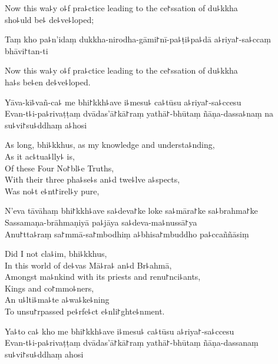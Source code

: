 \begin{english}
  Now this wa꜕y o꜕f pra꜕ctice leading to the ce꜓ssation of du꜕kkha\\
  sho꜕uld be꜕ de꜕ve꜕loped;
\end{english}

Taṃ kho pa꜕n'idaṃ dukkha-nirodha-gāmi꜓nī-pa꜕ṭi꜕pa꜕dā a꜕riya꜓-sa꜕ccaṃ bhāvi꜓tan-ti

\begin{english}
  Now this wa꜕y o꜕f pra꜕ctice leading to the ce꜓ssation of du꜕kkha\\
  ha꜕s be꜕en de꜕ve꜕loped.
\end{english}

Yāva-kī꜕vañ-ca꜕ me bhi꜓kkh꜕ave i꜕mesu꜕ ca꜕tūsu a꜕riya꜓-sa꜕ccesu\\
Evan-t꜕i-pa꜕rivaṭṭaṃ dvādas'ā꜓kā꜓raṃ yathā꜓-bhūtaṃ ñāṇa-dassa꜕naṃ na su꜕vi꜓su꜕ddhaṃ a꜕hosi

\begin{english}
  As long, bhi꜕kkhus, as my knowledge and understa꜕nding,\\
  As it ac꜕tua꜕lly꜕ is,\\
  Of these Four No꜓bl꜕e Truths,\\
  With their three pha꜕se꜕s an꜕d twe꜕lve a꜕spects,\\
  Was no꜕t e꜕nt꜓irel꜕y pure,
\end{english}

N'eva tāvāhaṃ bhi꜓kkh꜕ave sa꜕deva꜓ke loke sa꜕māra꜓ke sa꜕brahma꜓ke\\
Sassamaṇa-brāhmaṇiyā pa꜕jāya sa꜕deva-ma꜕nussā꜓ya\\
Anu꜓tta꜕raṃ sa꜓mmā-sa꜓mbodhiṃ a꜕bhisa꜓mbuddho pa꜕ccaññāsiṃ

\enlargethispage{\baselineskip}

\begin{english}
  Did I not cla꜕im, bhi꜕kkhus,\\
  In this world of de꜕vas Mā꜕ra꜕ an꜕d Br꜕ahmā,\\
  Amongst ma꜕nkind with its priests and renu꜓nci꜕ants,\\
  Kings and co꜓mmo꜕ners,\\
  An u꜕lti꜕ma꜕te a꜕wa꜕ke꜕ning\\
  To unsu꜓rpassed pe꜕rfe꜕ct e꜕nli꜓ghte꜕nment.
\end{english}

Ya꜕to ca꜕ kho me bhi꜓kkh꜕ave i꜕mesu꜕ ca꜕tūsu a꜕riya꜓-sa꜕ccesu\\
Evan-t꜕i-pa꜕rivaṭṭaṃ dvādas'ā꜓kā꜓raṃ yathā꜓-bhūtaṃ ñāṇa-dassanaṃ su꜕vi꜓su꜕ddhaṃ ahosi

